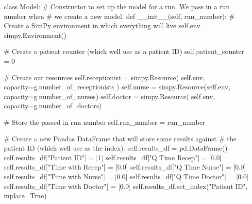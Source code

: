 \documentclass[
  letterpaper,
  DIV=11,
  numbers=noendperiod]{scrreprt}
\newenvironment{Shaded}{}{}
\newcommand{\CommentTok}[1]{\textcolor[rgb]{0.42,0.45,0.49}{#1}}
\newcommand{\DecValTok}[1]{\textcolor[rgb]{0.00,0.36,0.77}{#1}}
\newcommand{\FloatTok}[1]{\textcolor[rgb]{0.00,0.36,0.77}{#1}}
\newcommand{\FunctionTok}[1]{\textcolor[rgb]{0.44,0.26,0.76}{#1}}
\newcommand{\KeywordTok}[1]{\textcolor[rgb]{0.84,0.23,0.29}{#1}}
\newcommand{\NormalTok}[1]{\textcolor[rgb]{0.14,0.16,0.18}{#1}}
\newcommand{\OperatorTok}[1]{\textcolor[rgb]{0.14,0.16,0.18}{#1}}
\newcommand{\StringTok}[1]{\textcolor[rgb]{0.01,0.18,0.38}{#1}}
\newcommand{\VariableTok}[1]{\textcolor[rgb]{0.89,0.38,0.04}{#1}}
\begin{document}
\begin{Shaded}
\begin{Highlighting}[]
\KeywordTok{class}\NormalTok{ Model:}
    \CommentTok{\# Constructor to set up the model for a run.  We pass in a run number when}
    \CommentTok{\# we create a new model.}
    \KeywordTok{def} \FunctionTok{\_\_init\_\_}\NormalTok{(}\VariableTok{self}\NormalTok{, run\_number):}
        \CommentTok{\# Create a SimPy environment in which everything will live}
        \VariableTok{self}\NormalTok{.env }\OperatorTok{=}\NormalTok{ simpy.Environment()}

        \CommentTok{\# Create a patient counter (which we\textquotesingle{}ll use as a patient ID)}
        \VariableTok{self}\NormalTok{.patient\_counter }\OperatorTok{=} \DecValTok{0}

        \CommentTok{\# Create our resources}
        \VariableTok{self}\NormalTok{.receptionist }\OperatorTok{=}\NormalTok{ simpy.Resource(}
            \VariableTok{self}\NormalTok{.env, capacity}\OperatorTok{=}\NormalTok{g.number\_of\_receptionists}
\NormalTok{        )}
        \VariableTok{self}\NormalTok{.nurse }\OperatorTok{=}\NormalTok{ simpy.Resource(}\VariableTok{self}\NormalTok{.env, capacity}\OperatorTok{=}\NormalTok{g.number\_of\_nurses)}
        \VariableTok{self}\NormalTok{.doctor }\OperatorTok{=}\NormalTok{ simpy.Resource(}
            \VariableTok{self}\NormalTok{.env, capacity}\OperatorTok{=}\NormalTok{g.number\_of\_doctors)}

        \CommentTok{\# Store the passed in run number}
        \VariableTok{self}\NormalTok{.run\_number }\OperatorTok{=}\NormalTok{ run\_number}

        \CommentTok{\# Create a new Pandas DataFrame that will store some results against}
        \CommentTok{\# the patient ID (which we\textquotesingle{}ll use as the index).}
        \VariableTok{self}\NormalTok{.results\_df }\OperatorTok{=}\NormalTok{ pd.DataFrame()}
        \VariableTok{self}\NormalTok{.results\_df[}\StringTok{"Patient ID"}\NormalTok{] }\OperatorTok{=}\NormalTok{ [}\DecValTok{1}\NormalTok{]}
        \VariableTok{self}\NormalTok{.results\_df[}\StringTok{"Q Time Recep"}\NormalTok{] }\OperatorTok{=}\NormalTok{ [}\FloatTok{0.0}\NormalTok{]}
        \VariableTok{self}\NormalTok{.results\_df[}\StringTok{"Time with Recep"}\NormalTok{] }\OperatorTok{=}\NormalTok{ [}\FloatTok{0.0}\NormalTok{]}
        \VariableTok{self}\NormalTok{.results\_df[}\StringTok{"Q Time Nurse"}\NormalTok{] }\OperatorTok{=}\NormalTok{ [}\FloatTok{0.0}\NormalTok{]}
        \VariableTok{self}\NormalTok{.results\_df[}\StringTok{"Time with Nurse"}\NormalTok{] }\OperatorTok{=}\NormalTok{ [}\FloatTok{0.0}\NormalTok{]}
        \VariableTok{self}\NormalTok{.results\_df[}\StringTok{"Q Time Doctor"}\NormalTok{] }\OperatorTok{=}\NormalTok{ [}\FloatTok{0.0}\NormalTok{]}
        \VariableTok{self}\NormalTok{.results\_df[}\StringTok{"Time with Doctor"}\NormalTok{] }\OperatorTok{=}\NormalTok{ [}\FloatTok{0.0}\NormalTok{]}
        \VariableTok{self}\NormalTok{.results\_df.set\_index(}\StringTok{"Patient ID"}\NormalTok{, inplace}\OperatorTok{=}\VariableTok{True}\NormalTok{)}


\end{Highlighting}
\end{Shaded}
\end{document}
